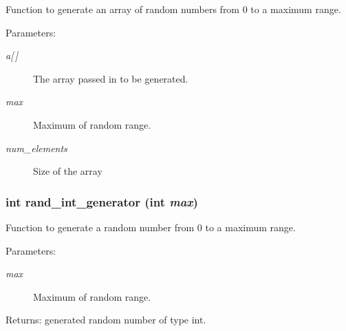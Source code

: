 Function to generate an array of random numbers from 0 to a maximum range. \begin{Desc}
\item[Parameters:]
\begin{description}
\item[{\em a\mbox{[}$\,$\mbox{]}}]The array passed in to be generated. \item[{\em max}]Maximum of random range. \item[{\em num\_\-elements}]Size of the array \end{description}
\end{Desc}
\subsubsection{\setlength{\rightskip}{0pt plus 5cm}int rand\_\-int\_\-generator (int {\em max})}\label{sort_8h_935f575e11a2bfdcb3968c2e51a322b8}


Function to generate a random number from 0 to a maximum range. \begin{Desc}
\item[Parameters:]
\begin{description}
\item[{\em max}]Maximum of random range. \end{description}
\end{Desc}
\begin{Desc}
\item[Returns:]generated random number of type int. \end{Desc}
